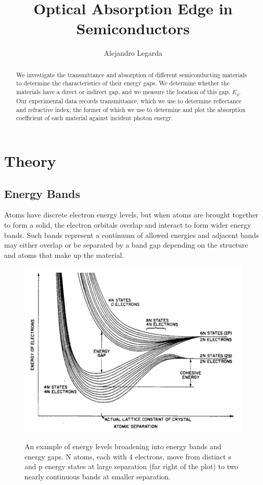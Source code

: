 \documentclass{article}
\title{Optical Absorption Edge in Semiconductors}
\author{Alejandro Legarda}
\begin{document}
\raggedright
\maketitle

\begin{abstract}
We investigate the transmittance and absorption of different semiconducting materials to determine the characteristics of their energy gaps. We determine whether the materials have a direct or indirect gap, and we measure the location of this gap, $E_g$. Our experimental data records transmittance, which we use to determine reflectance and refractive index, the former of which we use to determine and plot the absorption coefficient of each material against incident photon energy.
\end{abstract}
	
	
\tableofcontents
\newpage

\section{Theory}

\subsection{Energy Bands}

Atoms have discrete electron energy levels, but when atoms are brought together to form a solid, the electron orbitals overlap and interact to form wider energy bands. Such bands represent a continuum of allowed energies and adjacent bands may either overlap or be separated by a band gap depending on the structure and atoms that make up the material.\cite{lab manual}

\hspace{.25cm}


\begin{figure}[!htb]
	\centering
	\includegraphics[scale=1.]{plots/fig_1.png}
 	\label{bands}
	\caption{An example of energy levels broadening into energy bands and energy gaps. N atoms, each with 4 electrons, move from distinct s and p energy states at large separation (far right of the plot) to two nearly continuous bands at smaller separation.\cite{lab manual}}
\end{figure}
\end{document}
